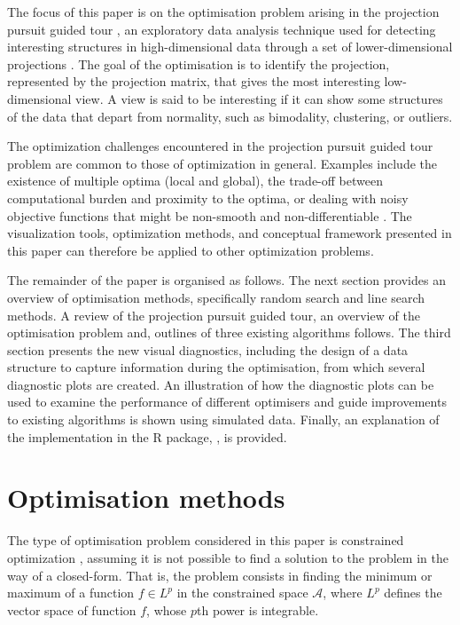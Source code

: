 The focus of this paper is on the optimisation problem arising in the
projection pursuit guided tour \citep{buja2005computational}, an
exploratory data analysis technique used for detecting interesting
structures in high-dimensional data through a set of lower-dimensional
projections \citep{cook2008grand}. The goal of the optimisation is to
identify the projection, represented by the projection matrix, that
gives the most interesting low-dimensional view. A view is said to be
interesting if it can show some structures of the data that depart from
normality, such as bimodality, clustering, or outliers.

The optimization challenges encountered in the projection pursuit guided
tour problem are common to those of optimization in general. Examples
include the existence of multiple optima (local and global), the
trade-off between computational burden and proximity to the optima, or
dealing with noisy objective functions that might be non-smooth and
non-differentiable \citep{jones1998efficient}. The visualization tools,
optimization methods, and conceptual framework presented in this paper
can therefore be applied to other optimization problems.

The remainder of the paper is organised as follows. The next section
provides an overview of optimisation methods, specifically random search
and line search methods. A review of the projection pursuit guided tour,
an overview of the optimisation problem and, outlines of three existing
algorithms follows. The third section presents the new visual
diagnostics, including the design of a data structure to capture
information during the optimisation, from which several diagnostic plots
are created. An illustration of how the diagnostic plots can be used to
examine the performance of different optimisers and guide improvements
to existing algorithms is shown using simulated data. Finally, an
explanation of the implementation in the R package, 
\citep{ferrn}, is provided.

\hypertarget{optim}{%
\section{Optimisation methods}\label{optim}}

The type of optimisation problem considered in this paper is constrained
optimization \citep{bertsekas2014constrained}, assuming it is not
possible to find a solution to the problem in the way of a closed-form.
That is, the problem consists in finding the minimum or maximum of a
function \(f \in L^p\) in the constrained space \(\mathcal{A}\), where
\(L^p\) defines the vector space of function \(f\), whose \(p\)th power
is integrable.

